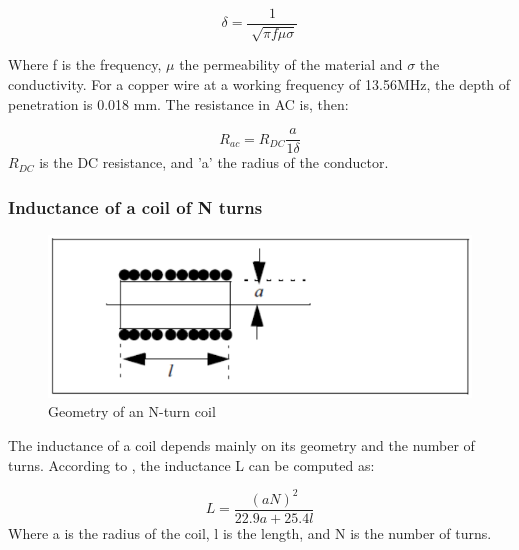 \documentclass[a4paper, 10pt, conference]{ieeeconf}      %
\begin{document}
\begin{equation}
{\delta = \frac{1}{\sqrt[]{\pi f \mu \sigma }}}
\end{equation}

Where f is the frequency, $\mu$ the permeability of the material and $\sigma$ the conductivity. For a copper wire at a working frequency of 13.56MHz, the depth of penetration is 0.018 mm. The resistance in AC is, then:

\begin{equation}
{R_{ac} = R_{DC} \frac{a}{1\delta}}
\end{equation}
$R_{DC}$ is the DC resistance, and 'a' the radius of the conductor.



\subsubsection{Inductance of a coil of N turns}

\begin{figure}[H]
\centering
\includegraphics[scale=0.3]{Images/ImagenesTesina/antena/Bobina_N_Espiras.png}
\caption{Geometry of an N-turn coil}
\label{fig:N_esp}
\end{figure}

The inductance of a coil depends mainly on its geometry and the number of turns. 
According to \cite{c9}, the inductance L can be computed as:

\begin{equation}
{L = \frac{(aN)^2}{22.9 a+25.4 l}}
\end{equation}
\newline
Where a is the radius of the coil, l is the length, and N is the number of turns.

\end{document}
